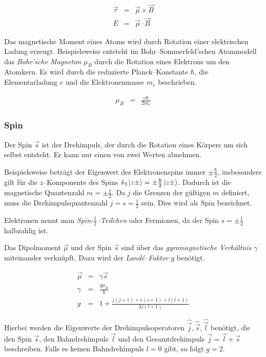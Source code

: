 \documentclass[12pt,a4paper]{scrartcl}
\numberwithin{equation}{section} %
\begin{document}
\begin{eqnarray}
	\vec \tau &=& \vec \mu \times \vec B \\
	E &=& \vec \mu \cdot \vec B \label{eq:EDipol}
\end{eqnarray}

\noindent
Das magnetische Moment eines Atoms wird durch Rotation einer elektrischen Ladung erzeugt. Beispielsweise entsteht im Bohr--Sommerfeld'schen Atommodell das \emph{Bohr'sche Magneton} $\mu_B$ durch die Rotation eines Elektrons um den Atomkern. Es wird durch die reduzierte Planck--Konstante $\hbar$, die Elementarladung $e$ und die Elektronenmasse $m_e$ beschrieben.

\begin{eqnarray}
	\mu_B &=& \frac{e\hbar}{2m_e}
\end{eqnarray}

\hypertarget{spin}{ \subsubsection{Spin}\label{spin}}

Der Spin $\vec s$ ist der Drehimpuls, der durch die Rotation eines Körpers um sich selbst entsteht. Er kann nur einen von zwei Werten abnehmen.

Beispielsweise beträgt der Eigenwert des Elektronenspins immer $\pm\frac{\hbar}{2}$, insbesondere gilt für die $z$--Komponente des Spins $\hat s_3\ket{z\pm}=\pm\frac{\hbar}{2}\ket{z\pm}$. Dadurch ist die magnetische Quantenzahl $m=\pm\frac{1}{2}$. Da $j$ die Grenzen der gültigen $m$ definiert, muss die Drehimpulsquantenzahl $j=s=\frac{1}{2}$ sein. Dies wird als Spin bezeichnet.

Elektronen nennt man \emph{Spin-$\frac{1}{2}$--Teilchen} oder Fermionen, da der Spin $s=\pm\frac{1}{2}$ halbzahlig ist.

Das Dipolmoment $\vec \mu$ und der Spin $\vec s$ sind über das \emph{gyromagnetische Verhältnis} $\gamma$ miteinander verknüpft. Dazu wird der \emph{Landé--Faktor} $g$ benötigt.

\begin{eqnarray}
	\vec \mu &=& \gamma \vec{s} \label{eq:dipolmomentSpin} \\
	\gamma &=& \frac{g\mu_B}{\hbar} \label{eq:gyromag} \\
	g &=& 1 + \frac{j(j+1) + s(s+1) + l(l+1)}{2j(l+1)}
\end{eqnarray}

\noindent
Hierbei werden die Eigenwerte der Drehimpulsoperatoren $\hat{\vec j},\hat{\vec s},\hat{\vec l}$ benötigt, die den Spin $\vec s$, den Bahndrehimpuls $\vec l$ und den Gesamtdrehimpuls $\vec j = \vec l + \vec s$ beschreiben. Falls es keinen Bahndrehimpuls $l=0$ gibt, so folgt $g=2$.
\end{document}
